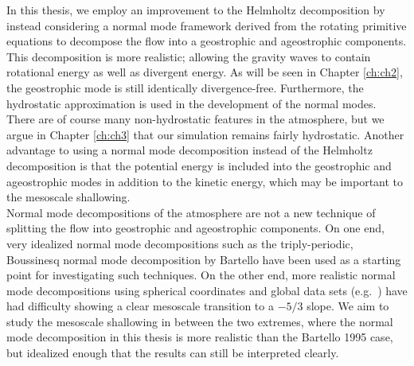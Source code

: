In this thesis, we employ an improvement to the Helmholtz decomposition by instead considering a normal mode framework derived from the rotating primitive equations to decompose the flow into a geostrophic and ageostrophic components. This decomposition is more realistic; allowing the gravity waves to contain rotational energy as well as divergent energy. As will be seen in Chapter \ref{ch:ch2}, the geostrophic mode is still identically divergence-free. Furthermore, the hydrostatic approximation is used in the development of the normal modes. There are of course many non-hydrostatic features in the atmosphere, but we argue in Chapter \ref{ch:ch3} that our simulation remains fairly hydrostatic. Another advantage to using a normal mode decomposition instead of the Helmholtz decomposition is that the potential energy is included into the geostrophic and ageostrophic modes in addition to the kinetic energy, which may be important to the mesoscale shallowing.\\

Normal mode decompositions of the atmosphere are not a new technique of splitting the flow into geostrophic and ageostrophic components. On one end, very idealized normal mode decompositions such as the triply-periodic, Boussinesq normal mode decomposition by Bartello \cite{Bartello1995} have been used as a starting point for investigating such techniques. On the other end, more realistic normal mode decompositions using spherical coordinates and global data sets (e.g.\ \cite{Terasaki2011}) have had difficulty showing a clear mesoscale transition to a $-5/3$ slope. We aim to study the mesoscale shallowing in between the two extremes, where the normal mode decomposition in this thesis is more realistic than the Bartello 1995 case, but idealized enough that the results can still be interpreted clearly.\\

